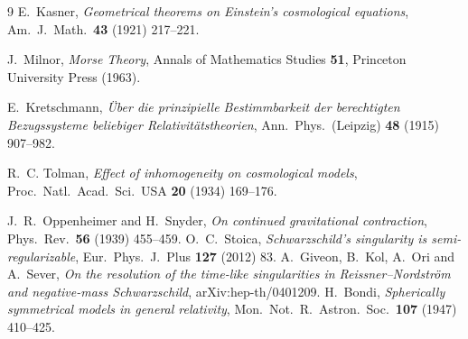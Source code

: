 \documentclass[11pt,a4paper]{article}
\theoremstyle{definition}
\begin{document}
\begin{thebibliography}{9}
E.~Kasner,
\emph{Geometrical theorems on Einstein's cosmological equations},
Am.~J.~Math.~\textbf{43} (1921) 217--221.

J.~Milnor,
\emph{Morse Theory},
Annals of Mathematics Studies \textbf{51}, Princeton University Press (1963).

E.~Kretschmann,
\emph{\"Uber die prinzipielle Bestimmbarkeit der berechtigten Bezugssysteme beliebiger Relativit\"atstheorien},
Ann.~Phys.~(Leipzig) \textbf{48} (1915) 907--982.

R.~C. Tolman,
\emph{Effect of inhomogeneity on cosmological models},
Proc.~Natl.~Acad.~Sci.~USA \textbf{20} (1934) 169--176.

J.~R.~Oppenheimer and H.~Snyder,
\emph{On continued gravitational contraction},
Phys.~Rev.~\textbf{56} (1939) 455--459.
O.~C.~Stoica,
\emph{Schwarzschild's singularity is semi-regularizable},
Eur.~Phys.~J.~Plus \textbf{127} (2012) 83.
A.~Giveon, B.~Kol, A.~Ori and A.~Sever,
\emph{On the resolution of the time-like singularities in Reissner--Nordstr\"om and negative-mass Schwarzschild},
arXiv:hep-th/0401209.
H.~Bondi,
\emph{Spherically symmetrical models in general relativity},
Mon.~Not.~R.~Astron.~Soc.~\textbf{107} (1947) 410--425.
\end{thebibliography}



\end{document}
